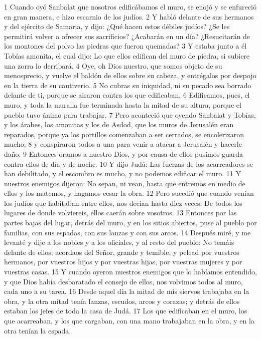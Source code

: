 1 Cuando oyó Sanbalat que nosotros edificábamos el muro, se enojó y se enfureció en gran manera, e hizo escarnio de los judíos.
2 Y habló delante de sus hermanos y del ejército de Samaria, y dijo: ¿Qué hacen estos débiles judíos? ¿Se les permitirá volver a ofrecer sus sacrificios? ¿Acabarán en un día? ¿Resucitarán de los montones del polvo las piedras que fueron quemadas?
3 Y estaba junto a él Tobías amonita, el cual dijo: Lo que ellos edifican del muro de piedra, si subiere una zorra lo derribará.
4 Oye, oh Dios nuestro, que somos objeto de su menosprecio, y vuelve el baldón de ellos sobre su cabeza, y entrégalos por despojo en la tierra de su cautiverio.
5 No cubras su iniquidad, ni su pecado sea borrado delante de ti, porque se airaron contra los que edificaban.
6 Edificamos, pues, el muro, y toda la muralla fue terminada hasta la mitad de su altura, porque el pueblo tuvo ánimo para trabajar.
7 Pero aconteció que oyendo Sanbalat y Tobías, y los árabes, los amonitas y los de Asdod, que los muros de Jerusalén eran reparados, porque ya los portillos comenzaban a ser cerrados, se encolerizaron mucho;
8 y conspiraron todos a una para venir a atacar a Jerusalén y hacerle daño.
9 Entonces oramos a nuestro Dios, y por causa de ellos pusimos guarda contra ellos de día y de noche.
10 Y dijo Judá: Las fuerzas de los acarreadores se han debilitado, y el escombro es mucho, y no podemos edificar el muro.
11 Y nuestros enemigos dijeron: No sepan, ni vean, hasta que entremos en medio de ellos y los matemos, y hagamos cesar la obra.
12 Pero sucedió que cuando venían los judíos que habitaban entre ellos, nos decían hasta diez veces: De todos los lugares de donde volviereis, ellos caerán sobre vosotros.
13 Entonces por las partes bajas del lugar, detrás del muro, y en los sitios abiertos, puse al pueblo por familias, con sus espadas, con sus lanzas y con sus arcos.
14 Después miré, y me levanté y dije a los nobles y a los oficiales, y al resto del pueblo: No temáis delante de ellos; acordaos del Señor, grande y temible, y pelead por vuestros hermanos, por vuestros hijos y por vuestras hijas, por vuestras mujeres y por vuestras casas.
15 Y cuando oyeron nuestros enemigos que lo habíamos entendido, y que Dios había desbaratado el consejo de ellos, nos volvimos todos al muro, cada uno a su tarea.
16 Desde aquel día la mitad de mis siervos trabajaba en la obra, y la otra mitad tenía lanzas, escudos, arcos y corazas; y detrás de ellos estaban los jefes de toda la casa de Judá.
17 Los que edificaban en el muro, los que acarreaban, y los que cargaban, con una mano trabajaban en la obra, y en la otra tenían la espada.
